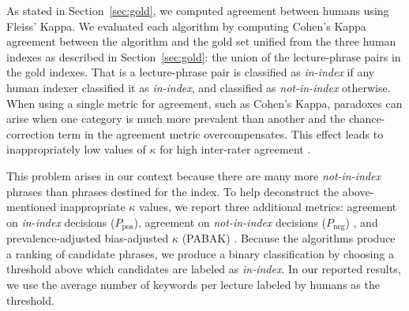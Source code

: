 
As stated in Section~\ref{sec:gold}, we computed agreement between
humans using Fleiss' Kappa. We evaluated each algorithm by computing
Cohen's Kappa agreement between the algorithm and the gold set
unified from the three human indexes as described in
Section~\ref{sec:gold}: the union of the lecture-phrase pairs in the
gold indexes. That is a lecture-phrase pair is classified as {\em
  in-index} if any human indexer classified it as {\em in-index}, and
classified as {\em not-in-index} otherwise. When using a single metric
for agreement, such as Cohen's Kappa, paradoxes can arise when one
category is much more prevalent than another and the chance-correction
term in the agreement metric overcompensates. This effect leads to
inappropriately low values of $\kappa$ for high inter-rater agreement
\cite{feinstein1990high}.

This problem arises in our context because there are many more {\em not-in-index} phrases than
phrases destined for the index. To help deconstruct the above-mentioned
inappropriate $\kappa$ values, we report three additional metrics:
agreement on {\em in-index} decisions ($P_{\text{pos}}$), agreement on
{\em not-in-index} decisions ($P_{\text{neg}}$)
\cite{cicchetti1990high}, and prevalence-adjusted bias-adjusted
$\kappa$ (PABAK) \cite{byrt1993bias}. Because the algorithms produce a
ranking of candidate phrases, we produce a binary classification by
choosing a threshold above which candidates are labeled as {\em
  in-index}. In our reported results, we use the average number of
keywords per lecture labeled by humans as the threshold.

